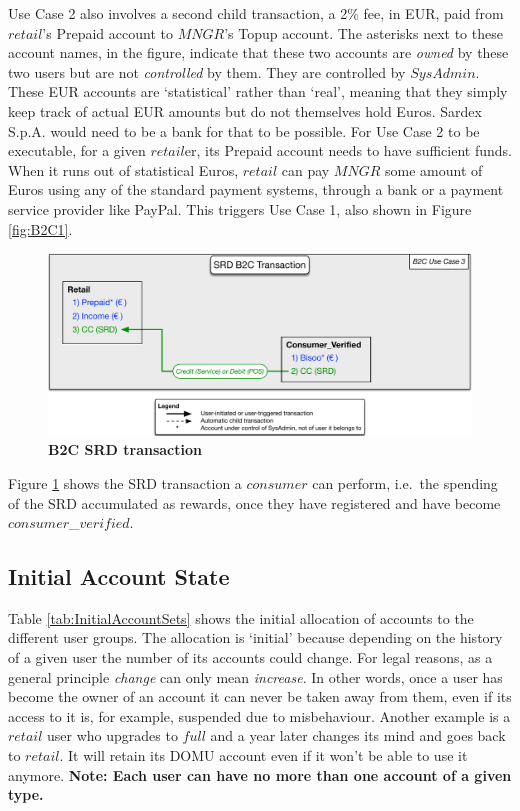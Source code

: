 Use Case 2 also involves a second child transaction, a 2\% fee, in EUR, paid from $retail$'s Prepaid account to $MNGR$'s Topup account. The asterisks next to these account names, in the figure, indicate that these two accounts are \emph{owned} by these two users but are not \emph{controlled} by them. They are controlled by $SysAdmin$. These EUR accounts are `statistical' rather than `real', meaning that they simply keep track of actual EUR amounts but do not themselves hold Euros. Sardex S.p.A. would need to be a bank for that to be possible. For Use Case 2 to be executable, for a given $retail$er, its Prepaid account needs to have sufficient funds. When it runs out of statistical Euros, $retail$ can pay $MNGR$ some amount of Euros using any of the standard payment systems, through a bank or a payment service provider like PayPal. This triggers Use Case 1, also shown in Figure \ref{fig:B2C1}.

\begin{figure}[h]
\centering
\includegraphics[width=15cm]{Figures/B2C2}
\caption{\small\textbf{B2C SRD transaction}}
\label{fig:B2C2}
\end{figure}

Figure \ref{fig:B2C2} shows the SRD transaction a $consumer$ can perform, i.e.\ the spending of the SRD accumulated as rewards, once they have registered and have become $consumer$\_$verified$.

\subsection{Initial Account State}
Table \ref{tab:InitialAccountSets} shows the initial allocation of accounts to the different user groups. The allocation is `initial' because  depending on the history of a given user the number of its accounts could change. For legal reasons, as a general principle \emph{change} can only mean \emph{increase}. In other words, once a user has become the owner of an account it can never be taken away from them, even if its access to it is, for example, suspended due to misbehaviour. Another example is a $retail$ user who upgrades to $full$ and a year later changes its mind and goes back to $retail$. It will retain its DOMU account even if it won't be able to use it anymore. {\bf Note: Each user can have no more than one account of a given type.}

